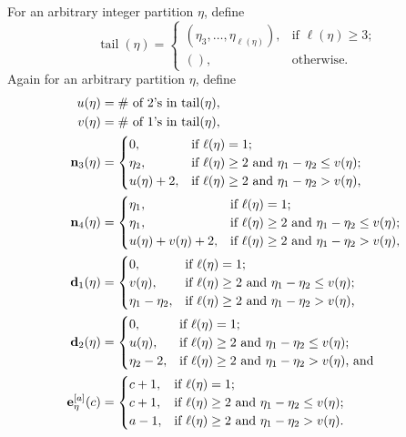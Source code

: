 \documentclass[12pt]{article}
\begin{document}
 For an arbitrary integer partition $\eta$, define 
$$ \operatorname{tail}(\eta) = \begin{cases} 
 (\eta_3, \ldots, \eta_{\ell(\eta)}), 
 & \text{if $\ell(\eta) \geq 3$;} \\
 (), & \text{otherwise.} 
 \end{cases} $$ Again for an arbitrary partition $\eta$, define 
\begin{align*} 
 u(\eta) & = \text{$\#$ of 2's in $\operatorname{tail}(\eta)$}, \\ 
 v(\eta) & = \text{$\#$ of 1's in $\operatorname{tail}(\eta)$}, \\ 
 \text{{\bf n}}_{3}(\eta) & = \begin{cases} 
 0, & \text{if $\ell(\eta) = 1$;} \\
 \eta_2, & \text{if $\ell(\eta) \geq 2$ and $\eta_1 - \eta_2 \leq v(\eta)$;} \\
 u(\eta) + 2, & \text{if $\ell(\eta) \geq 2$ and $\eta_1 - \eta_2 > v(\eta)$,} 
 \end{cases} \\ 
 \text{{\bf n}}_{4}(\eta) & = \begin{cases} 
 \eta_{1}, & \text{if $\ell(\eta) = 1$;} \\
 \eta_1, & \text{if $\ell(\eta) \geq 2$ and $\eta_1 - \eta_2 \leq v(\eta)$;} \\
 u(\eta) + v(\eta) + 2, & \text{if $\ell(\eta) \geq 2$ and $\eta_1 - \eta_2 > v(\eta)$, } 
 \end{cases} \\ 
 \text{{\bf d}}_{1}(\eta) & = \begin{cases} 
 0, & \text{if $\ell(\eta) = 1$;} \\
 v(\eta), & \text{if $\ell(\eta) \geq 2$ and $\eta_1 - \eta_2 \leq v(\eta)$;} \\
 \eta_1 - \eta_2, & \text{if $\ell(\eta) \geq 2$ and $\eta_1 - \eta_2 > v(\eta)$, } 
 \end{cases} \\ 
 \text{{\bf d}}_{2}(\eta) & = \begin{cases} 
 0, & \text{if $\ell(\eta) = 1$;} \\
 u(\eta), & \text{if $\ell(\eta) \geq 2$ and $\eta_1 - \eta_2 \leq v(\eta)$;} \\
 \eta_2 - 2, & \text{if $\ell(\eta) \geq 2$ and $\eta_1 - \eta_2 > v(\eta)$, and } 
 \end{cases} \\ 
 \text{{\bf e}}^{[a]}_{\eta}(c) 
 & = \begin{cases} 
 c + 1, & \text{if $\ell(\eta) = 1$;} \\
 c + 1, & \text{if $\ell(\eta) \geq 2$ and $\eta_1 - \eta_2 \leq v(\eta)$;} \\
 a - 1, & \text{if $\ell(\eta) \geq 2$ and $\eta_1 - \eta_2 > v(\eta)$.} 
 \end{cases}
\end{align*}
\end{document}
